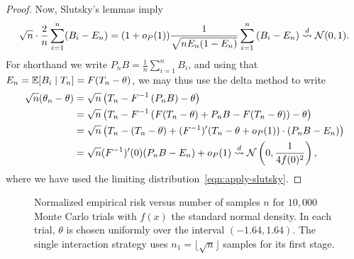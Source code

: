 \begin{proof}
  Now,
  Slutsky's lemmas imply
  \begin{equation}
    \sqrt{n}
    \cdot \frac{2}{n} \sum_{i = 1}^n (B_i - E_n)
    =
    (1 + o_P(1)) \frac{1}{\sqrt{n E_n(1 - E_n)}}
    \sum_{i = 1}^n \left(B_i - E_n\right)
    \stackrel{d}{\rightsquigarrow} \mathcal{N}(0, 1).
    \label{eqn:apply-slutsky}
  \end{equation}
  For shorthand we write $P_n B = \frac{1}{n} \sum_{i = 1}^n B_i$,
  and using that $E_n = \mathbb{E}[B_i \mid T_n] = F(T_n - \theta)$, we may thus
  use the delta method to write
  \begin{align*}
    \sqrt{n}(\theta_n - \theta)
    & = \sqrt{n}\left(T_n - F^{-1}\left(P_n B\right)
    - \theta \right) \\
    & = \sqrt{n} \left(T_n - F^{-1}\left(F(T_n - \theta)
    + P_n B - F(T_n - \theta)\right) - \theta \right) \\
    & = \sqrt{n} \left(T_n - (T_n - \theta )
    + (F^{-1})'(T_n - \theta + o_P(1))\cdot \left(
    P_n B - E_n\right) \right) \\
    & = \sqrt{n} (F^{-1})'(0) (P_n B - E_n)
    + o_P(1)
    \stackrel{d}{\rightsquigarrow} \mathcal{N}\left(0, \frac{1}{4 f(0)^2}\right),
  \end{align*}
  where we have used the limiting distribution~\eqref{eqn:apply-slutsky}.
\end{proof}
%

\begin{figure}
\begin{center}
\caption{Normalized empirical risk versus number of samples $n$ for $10,000$ Monte Carlo trials with $f(x)$ the standard normal density. In each trial, $\theta$ is chosen uniformly over the interval $(-1.64,1.64)$. The single interaction strategy uses $n_1 = \lfloor \sqrt{n} \rfloor$ samples for its first stage. 
\label{fig:adaptive_error}  }
\end{center}
\end{figure}
